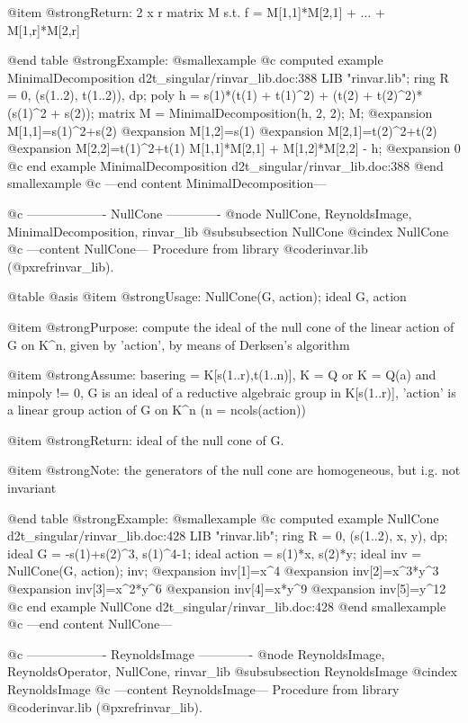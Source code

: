 @item @strong{Return:}
2 x r matrix M s.t. f = M[1,1]*M[2,1] + ... + M[1,r]*M[2,r]

@end table
@strong{Example:}
@smallexample
@c computed example MinimalDecomposition d2t_singular/rinvar_lib.doc:388 
LIB "rinvar.lib";
ring R = 0, (s(1..2), t(1..2)), dp;
poly h = s(1)*(t(1) + t(1)^2) +  (t(2) + t(2)^2)*(s(1)^2 + s(2));
matrix M = MinimalDecomposition(h, 2, 2);
M;
@expansion{} M[1,1]=s(1)^2+s(2)
@expansion{} M[1,2]=s(1)
@expansion{} M[2,1]=t(2)^2+t(2)
@expansion{} M[2,2]=t(1)^2+t(1)
M[1,1]*M[2,1] + M[1,2]*M[2,2] - h;
@expansion{} 0
@c end example MinimalDecomposition d2t_singular/rinvar_lib.doc:388
@end smallexample
@c ---end content MinimalDecomposition---

@c ------------------- NullCone -------------
@node NullCone, ReynoldsImage, MinimalDecomposition, rinvar_lib
@subsubsection NullCone
@cindex NullCone
@c ---content NullCone---
Procedure from library @code{rinvar.lib} (@pxref{rinvar_lib}).

@table @asis
@item @strong{Usage:}
NullCone(G, action); ideal G, action

@item @strong{Purpose:}
compute the ideal of the null cone of the linear action of G on K^n,
given by 'action', by means of Derksen's algorithm

@item @strong{Assume:}
basering = K[s(1..r),t(1..n)], K = Q or K = Q(a) and minpoly != 0,
G is an ideal of a reductive algebraic group in K[s(1..r)],
'action' is a linear group action of G on K^n (n = ncols(action))

@item @strong{Return:}
ideal of the null cone of G.

@item @strong{Note:}
the generators of the null cone are homogeneous, but i.g. not invariant

@end table
@strong{Example:}
@smallexample
@c computed example NullCone d2t_singular/rinvar_lib.doc:428 
LIB "rinvar.lib";
ring R = 0, (s(1..2), x, y), dp;
ideal G = -s(1)+s(2)^3, s(1)^4-1;
ideal action = s(1)*x, s(2)*y;
ideal inv = NullCone(G, action);
inv;
@expansion{} inv[1]=x^4
@expansion{} inv[2]=x^3*y^3
@expansion{} inv[3]=x^2*y^6
@expansion{} inv[4]=x*y^9
@expansion{} inv[5]=y^12
@c end example NullCone d2t_singular/rinvar_lib.doc:428
@end smallexample
@c ---end content NullCone---

@c ------------------- ReynoldsImage -------------
@node ReynoldsImage, ReynoldsOperator, NullCone, rinvar_lib
@subsubsection ReynoldsImage
@cindex ReynoldsImage
@c ---content ReynoldsImage---
Procedure from library @code{rinvar.lib} (@pxref{rinvar_lib}).

